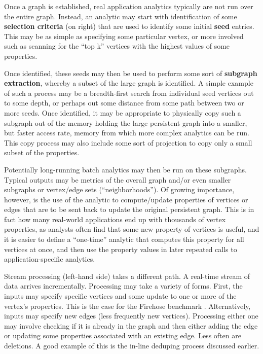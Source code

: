 Once a graph is established, real application analytics typically are not run over the entire graph. Instead, an analytic may start with identification of some  \textbf{selection criteria} (on right) that are used to identify some initial \textbf{seed} entries. This may be as simple as specifying some particular vertex, or more involved such as scanning for the ``top k'' vertices with the highest values of some properties.

Once identified, these seeds may then be used to perform some sort of \textbf{subgraph extraction}, whereby a subset of the large graph is identified. A simple example of such a process may be a breadth-first search from individual seed vertices out to some depth, or perhaps out some distance from some path between two or more seeds. Once identified, it may be appropriate to physically copy such a subgraph out of the memory holding the large persistent graph into a smaller, but faster access rate, memory from which more complex analytics can be run. This copy process may also include some sort of projection to copy only a small subset of the properties.

Potentially long-running batch analytics may then be run on these subgraphs. Typical outputs may be metrics of the overall graph and/or even smaller subgraphs or vertex/edge sets (``neighborhoods''). Of growing importance, however, is the use of the analytic to compute/update properties of vertices or edges that are to be sent back to update the original persistent graph. This is in fact how many real-world applications end up with thousands of vertex properties, as analysts often find that some new property of vertices is useful, and it is easier to define a ``one-time'' analytic that computes this property for all vertices at once, and then use the property values in later repeated calls to application-specific analytics.

Stream processing (left-hand side) takes a different path. A real-time stream of data arrives incrementally. Processing may take a variety of forms. First, the inputs may specify specific vertices and some update to one or more of the vertex's properties. This is the case for the Firehose benchmark \cite{sga-firehose}. Alternatively, inputs may specify new edges (less frequently new vertices). Processing either one may involve checking if it is already in the graph and then either adding the edge or updating some properties associated with an existing edge. Less often are deletions. A good example of this is the in-line deduping process discussed earlier.

